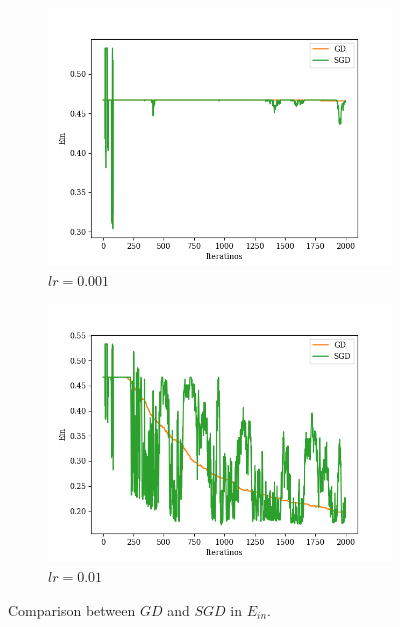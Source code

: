 \documentclass[12pt,a4paper]{article}
\theoremstyle{remark}
\begin{document}
\section{} %
\begin{figure}[h]%
	\begin{subfigure}[h]{0.45\textwidth}
		\includegraphics[width=\textwidth]{code/q8_001.png}
		\caption{$lr=0.001$}
	\end{subfigure}
	\hfill\vrule\hfill
	\begin{subfigure}[h]{0.45\textwidth}
		\includegraphics[width=\textwidth]{code/q8_01.png}
		\caption{$lr=0.01$}
	\end{subfigure}%
	\caption{Comparison between $GD$ and $SGD$ in $E_{in}$.}
	\label{fig:q8}
\end{figure}
\end{document}

